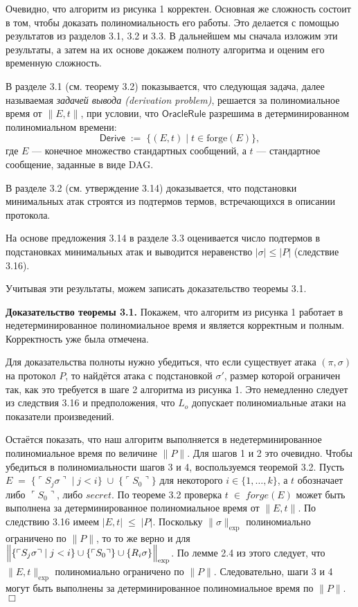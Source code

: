 Очевидно, что алгоритм из рисунка 1 корректен. Основная же сложность состоит в том, чтобы доказать полиномиальность его работы. Это делается с помощью результатов из разделов 3.1, 3.2 и 3.3. В дальнейшем мы сначала изложим эти результаты, а затем на их основе докажем полноту алгоритма и оценим его временную сложность.

В разделе 3.1 (см. теорему 3.2) показывается, что следующая задача, далее называемая \emph{задачей вывода (derivation problem)}, решается за полиномиальное время от \(\lVert E,t\rVert\), при условии, что \(\mathsf{OracleRule}\) разрешима в детерминированном полиномиальном времени:
\[
\mathsf{Derive} \;:=\; \bigl\{(E,t)\mid t\in\mathrm{forge}(E)\bigr\},
\]
где \(E\) — конечное множество стандартных сообщений, а \(t\) — стандартное сообщение, заданные в виде DAG.

В разделе 3.2 (см. утверждение 3.14) доказывается, что подстановки минимальных атак строятся из подтермов термов, встречающихся в описании протокола.

На основе предложения 3.14 в разделе 3.3 оценивается число подтермов в подстановках минимальных атак и выводится неравенство \(\lvert\sigma\rvert \le \lvert P\rvert\) (следствие 3.16).

Учитывая эти результаты, можем записать доказательство теоремы 3.1.

\medskip
\noindent\textbf{Доказательство теоремы 3.1.}  
Покажем, что алгоритм из рисунка 1 работает в недетерминированное полиномиальное время и является корректным и полным. Корректность уже была отмечена.

Для доказательства полноты нужно убедиться, что если существует атака \((\pi,\sigma)\) на протокол \(P\), то найдётся атака с подстановкой \(\sigma'\), размер которой ограничен так, как это требуется в шаге 2 алгоритма из рисунка 1. Это немедленно следует из следствия 3.16 и предположения, что \(L_o\) допускает полиномиальные атаки на показатели произведений.

Остаётся показать, что наш алгоритм выполняется в недетерминированное полиномиальное время по величине \(\lVert P\rVert\). Для шагов 1 и 2 это очевидно. Чтобы убедиться в полиномиальности шагов 3 и 4, воспользуемся теоремой 3.2. Пусть $E \;=\;\{\ulcorner S_j\sigma\urcorner \mid j<i\}\;\cup\;\{\ulcorner S_0\urcorner\}$
для некоторого \(i\in\{1,\dots,k\}\), а \(t\) обозначает либо \(\ulcorner S_0\urcorner\), либо \(\mathit{secret}\). По теореме 3.2 проверка $t \;\in\;\mathit{forge}(E)$
может быть выполнена за детерминированное полиномиальное время от \(\lVert E,t\rVert\). По следствию 3.16 имеем
$|E,t| \;\le\;|P|$. Поскольку \(\|\sigma\|_{\mathrm{exp}}\) полиномиально ограничено по \(\lVert P\rVert\), то то же верно и для
$\Bigl\|\{\ulcorner S_j\sigma\urcorner\mid j<i\}\cup\{\ulcorner S_0\urcorner\}\cup\{R_i\sigma\}\Bigr\|_{\mathrm{exp}}$.
По лемме 2.4 из этого следует, что \(\lVert E,t\rVert_{\mathrm{exp}}\) полиномиально ограничено по \(\lVert P\rVert\). Следовательно, шаги 3 и 4 могут быть выполнены за детерминированное полиномиальное время по \(\lVert P\rVert\).  
\(\Box\)

